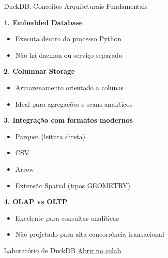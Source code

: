 \documentclass{beamer}
\begin{document}
\begin{frame}{DuckDB: Conceitos Arquiteturais Fundamentais}
    
    \textbf{1. Embedded Database}
    \begin{itemize}
        \item Executa dentro do processo Python
        \item Não há daemon ou serviço separado
    \end{itemize}
    
    \vspace{0.3cm}
    
    \textbf{2. Columnar Storage}
    \begin{itemize}
        \item Armazenamento orientado a colunas
        \item Ideal para agregações e scans analíticos
    \end{itemize}
    
    \vspace{0.3cm}
    
    \textbf{3. Integração com formatos modernos}
    \begin{itemize}
        \item Parquet (leitura direta)
        \item CSV
        \item Arrow
        \item Extensão Spatial (tipos GEOMETRY)
    \end{itemize}
    
    \vspace{0.3cm}
    
    \textbf{4. OLAP vs OLTP}
    \begin{itemize}
        \item Excelente para consultas analíticas
        \item Não projetado para alta concorrência transacional
    \end{itemize}
    
\end{frame}

\begin{frame}[fragile]{Laboratório de DuckDB}
\href{https://colab.research.google.com/github/mauriciodev/progcart/blob/main/aulas/jupyter/duckdb_brasil.ipynb}{Abrir no colab}

\end{frame}
\end{document}
